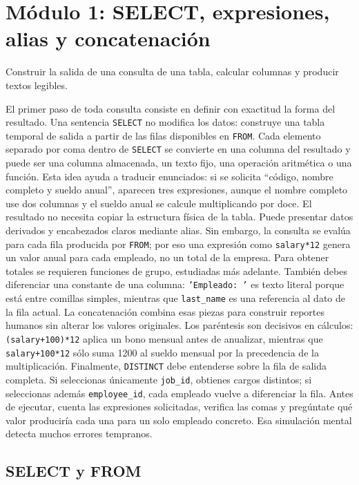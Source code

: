 \documentclass[11pt,a4paper]{article}
\newcommand{\campo}[1]{\texttt{#1}}
\begin{document}
\section{Módulo 1: SELECT, expresiones, alias y concatenación}

\begin{objetivo}
Construir la salida de una consulta de una tabla, calcular columnas y producir textos legibles.
\end{objetivo}

El primer paso de toda consulta consiste en definir con exactitud la forma del resultado. Una
sentencia \campo{SELECT} no modifica los datos: construye una tabla temporal de salida a partir de las
filas disponibles en \campo{FROM}. Cada elemento separado por coma dentro de \campo{SELECT} se
convierte en una columna del resultado y puede ser una columna almacenada, un texto fijo, una
operación aritmética o una función. Esta idea ayuda a traducir enunciados: si se solicita ``código,
nombre completo y sueldo anual'', aparecen tres expresiones, aunque el nombre completo use dos
columnas y el sueldo anual se calcule multiplicando por doce. El resultado no necesita copiar la
estructura física de la tabla. Puede presentar datos derivados y encabezados claros mediante alias.
Sin embargo, la consulta se evalúa para cada fila producida por \campo{FROM}; por eso una expresión
como \campo{salary*12} genera un valor anual para cada empleado, no un total de la empresa. Para
obtener totales se requieren funciones de grupo, estudiadas más adelante. También debes diferenciar
una constante de una columna: \campo{'Empleado: '} es texto literal porque está entre comillas
simples, mientras que \campo{last_name} es una referencia al dato de la fila actual. La concatenación
combina esas piezas para construir reportes humanos sin alterar los valores originales. Los
paréntesis son decisivos en cálculos: \campo{(salary+100)*12} aplica un bono mensual antes de
anualizar, mientras que \campo{salary+100*12} sólo suma 1200 al sueldo mensual por la precedencia de
la multiplicación. Finalmente, \campo{DISTINCT} debe entenderse sobre la fila de salida completa. Si
seleccionas únicamente \campo{job_id}, obtienes cargos distintos; si seleccionas además
\campo{employee_id}, cada empleado vuelve a diferenciar la fila. Antes de ejecutar, cuenta las
expresiones solicitadas, verifica las comas y pregúntate qué valor produciría cada una para un solo
empleado concreto. Esa simulación mental detecta muchos errores tempranos.

\subsection{SELECT y FROM}
\end{document}
